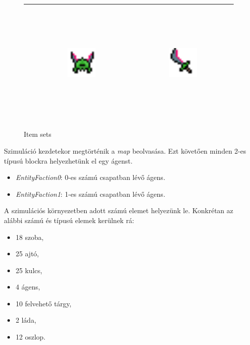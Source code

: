 \begin{figure}[h!]
\begin{center}
\begin{tabular}{ | c | c | c | }
            & 
            \includegraphics[width=0.3\textwidth, height=60mm]{images/Entity_Helmet_02.png}    
            & 
            \includegraphics[width=0.3\textwidth, height=60mm]{images/Entity_Weapon_02.png}
            \\
            \hline
        \end{tabular}
        \caption{Item sets}
        \label{tbl:Equipable items}
    \end{center}
\end{figure}

Szimuláció kezdetekor megtörténik a \textit{map} beolvasása. Ezt követően minden 2-es típusú blockra helyezhetünk el egy ágenst.
\begin{itemize}
    \item \textit{EntityFaction0}: 0-es számú csapatban lévő ágens.
    \item \textit{EntityFaction1}: 1-es számú csapatban lévő ágens.
\end{itemize}

A szimulációs környezetben adott számú elemet helyezünk le. Konkrétan az alábbi számú és típusú elemek kerülnek rá:
\begin{itemize}
    \item 18 szoba, 
    \item 25 ajtó,
    \item 25 kulcs,
    \item 4 ágens,
    \item 10 felvehető tárgy,
    \item 2 láda,
    \item 12 oszlop.
\end{itemize}

